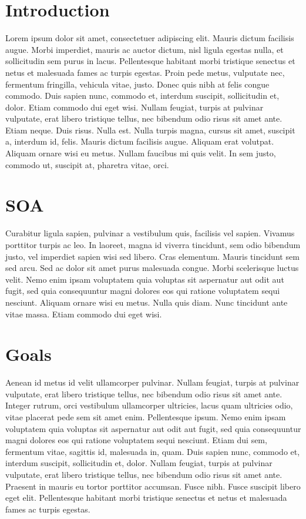 \documentclass[%
  14pt,       				%
  a4paper,    				%
	twoside,      			%
	unicode,						%
]{extreport}				  %
\begin{document}
\cleardoublepage\pagestyle{plain}   %

\chapter*{Introduction}
Lorem ipsum dolor sit amet, consectetuer adipiscing elit. Mauris dictum facilisis augue. Morbi imperdiet, mauris ac auctor dictum, nisl ligula egestas nulla, et sollicitudin sem purus in lacus. Pellentesque habitant morbi tristique senectus et netus et malesuada fames ac turpis egestas. Proin pede metus, vulputate nec, fermentum fringilla, vehicula vitae, justo. Donec quis nibh at felis congue commodo. Duis sapien nunc, commodo et, interdum suscipit, sollicitudin et, dolor. Etiam commodo dui eget wisi. Nullam feugiat, turpis at pulvinar vulputate, erat libero tristique tellus, nec bibendum odio risus sit amet ante. Etiam neque. Duis risus. Nulla est. Nulla turpis magna, cursus sit amet, suscipit a, interdum id, felis. Mauris dictum facilisis augue. Aliquam erat volutpat. Aliquam ornare wisi eu metus. Nullam faucibus mi quis velit. In sem justo, commodo ut, suscipit at, pharetra vitae, orci.

\chapter{SOA}
Curabitur ligula sapien, pulvinar a vestibulum quis, facilisis vel sapien. Vivamus porttitor turpis ac leo. In laoreet, magna id viverra tincidunt, sem odio bibendum justo, vel imperdiet sapien wisi sed libero. Cras elementum. Mauris tincidunt sem sed arcu. Sed ac dolor sit amet purus malesuada congue. Morbi scelerisque luctus velit. Nemo enim ipsam voluptatem quia voluptas sit aspernatur aut odit aut fugit, sed quia consequuntur magni dolores eos qui ratione voluptatem sequi nesciunt. Aliquam ornare wisi eu metus. Nulla quis diam. Nunc tincidunt ante vitae massa. Etiam commodo dui eget wisi.

\chapter{Goals}
Aenean id metus id velit ullamcorper pulvinar. Nullam feugiat, turpis at pulvinar vulputate, erat libero tristique tellus, nec bibendum odio risus sit amet ante. Integer rutrum, orci vestibulum ullamcorper ultricies, lacus quam ultricies odio, vitae placerat pede sem sit amet enim. Pellentesque ipsum. Nemo enim ipsam voluptatem quia voluptas sit aspernatur aut odit aut fugit, sed quia consequuntur magni dolores eos qui ratione voluptatem sequi nesciunt. Etiam dui sem, fermentum vitae, sagittis id, malesuada in, quam. Duis sapien nunc, commodo et, interdum suscipit, sollicitudin et, dolor. Nullam feugiat, turpis at pulvinar vulputate, erat libero tristique tellus, nec bibendum odio risus sit amet ante. Praesent in mauris eu tortor porttitor accumsan. Fusce nibh. Fusce suscipit libero eget elit. Pellentesque habitant morbi tristique senectus et netus et malesuada fames ac turpis egestas.
\end{document}
